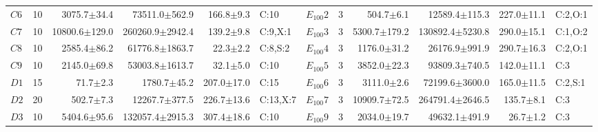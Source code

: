 \begin{table}[!b]
\begin{tabular}{@{}lrrrrl@{\hspace{3pt}}lrrrrl@{}}
$C6$ & 10 & 3075.7$\pm$34.4 & 73511.0$\pm$562.9 & 166.8$\pm$9.3 & C:10 & $E_{100}2$ & 3 & 504.7$\pm$6.1 & 12589.4$\pm$115.3 & 227.0$\pm$11.1 & C:2,O:1 \\
$C7$ & 10 & 10800.6$\pm$129.0 & 260260.9$\pm$2942.4 & 139.2$\pm$9.8 & C:9,X:1 & $E_{100}3$ & 3 & 5300.7$\pm$179.2 & 130892.4$\pm$5230.8 & 290.0$\pm$15.1 & C:1,O:2 \\
$C8$ & 10 & 2585.4$\pm$86.2 & 61776.8$\pm$1863.7 & 22.3$\pm$2.2 & C:8,S:2 & $E_{100}4$ & 3 & 1176.0$\pm$31.2 & 26176.9$\pm$991.9 & 290.7$\pm$16.3 & C:2,O:1 \\
$C9$ & 10 & 2145.0$\pm$69.8 & 53003.8$\pm$1613.7 & 32.1$\pm$5.0 & C:10 & $E_{100}5$ & 3 & 3852.0$\pm$22.3 & 93809.3$\pm$740.5 & 142.0$\pm$11.1 & C:3 \\
$D1$ & 15 & 71.7$\pm$2.3 & 1780.7$\pm$45.2 & 207.0$\pm$17.0 & C:15 & $E_{100}6$ & 3 & 3111.0$\pm$2.6 & 72199.6$\pm$3600.0 & 165.0$\pm$11.5 & C:2,S:1 \\
$D2$ & 20 & 502.7$\pm$7.3 & 12267.7$\pm$377.5 & 226.7$\pm$13.6 & C:13,X:7 & $E_{100}7$ & 3 & 10909.7$\pm$72.5 & 264791.4$\pm$2646.5 & 135.7$\pm$8.1 & C:3 \\
$D3$ & 10 & 5404.6$\pm$95.6 & 132057.4$\pm$2915.3 & 307.4$\pm$18.6 & C:10 & $E_{100}9$ & 3 & 2034.0$\pm$19.7 & 49632.1$\pm$491.9 & 26.7$\pm$1.2 & C:3 \\
\bottomrule
\end{tabular}
\end{table}
\endgroup
